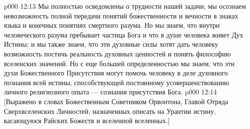\vs p000 12:13 Мы полностью осведомлены о трудности нашей задачи; мы осознаем невозможность полной передачи понятий божественности и вечности в знаках языка и конечных понятиях смертного разума. Но мы знаем, что внутри человеческого разума пребывает частица Бога и что в душе человека живет Дух Истины; и мы также знаем, что эти духовные силы хотят дать человеку возможность постичь реальность духовных ценностей и понять философию вселенских значений. Но с еще большей определенностью мы знаем, что эти духи Божественного Присутствия могут помочь человеку в деле духовного познания всей истины, способствующей постоянному усовершенствованию личного религиозного опыта --- сознания присутствия Бога.
\vsetoff
\vs p000 12:14 [Выражено в словах Божественным Советником Орвонтона, Главой Отряда Сверхвселенских Личностей, назначенных описать на Урантии истину, касающуюся Райских Божеств и вселенной вселенных.]
